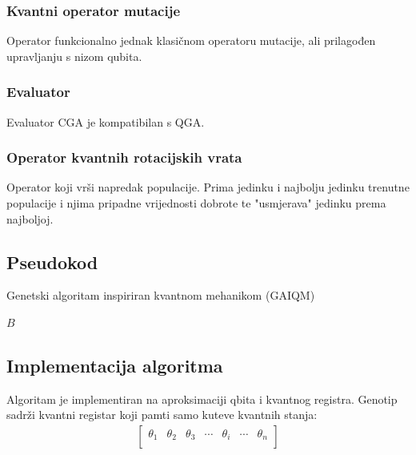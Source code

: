 \documentclass[times, utf8, zavrsni]{fer}
\begin{document}
\subsubsection{Kvantni operator mutacije}
Operator funkcionalno jednak klasičnom operatoru mutacije, ali prilagođen upravljanju s nizom qubita.
\subsubsection{Evaluator}
Evaluator CGA je kompatibilan s QGA.
\subsubsection{Operator kvantnih rotacijskih vrata}
Operator koji vrši napredak populacije. Prima jedinku i najbolju jedinku trenutne populacije i njima pripadne vrijednosti dobrote te "usmjerava" jedinku prema najboljoj.

\subsection{Pseudokod}
\begin{algorithm}
\caption{Genetski algoritam inspiriran kvantnom mehanikom (GAIQM)}
\label{algo:gaiqm}
\begin{algorithmic}
\ENDWHILE
\RETURN $B$
\end{algorithmic}
\end{algorithm}

\subsection{Implementacija algoritma}
Algoritam je implementiran na aproksimaciji qbita i kvantnog registra. Genotip sadrži kvantni registar koji pamti samo kuteve kvantnih stanja:
\begin{align*}
\begin{bmatrix}
\theta_1 & \theta_2 & \theta_3 & \cdots & \theta_i & \cdots & \theta_n \\
\end{bmatrix}
\end{align*}

\paragraph{}
\end{document}
